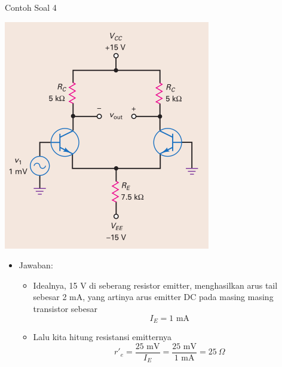 \documentclass[aspectratio=169]{beamer}
\begin{document}
\begin{frame}{Contoh Soal 4}
	\begin{multicols}{2}
		\begin{center}
			\includegraphics[height=0.7\textheight]{gambar/01.contoh_soal_1-2}
		\end{center}
		\columnbreak
		\begin{itemize}
			\item Jawaban:
			\begin{itemize}
				\item Idealnya, 15 V di seberang resistor emitter, menghasilkan arus tail sebesar 2 mA, yang artinya arus emitter DC pada masing masing transistor sebesar
				\[ I_E = 1 \text{ mA} \]
				\item Lalu kita hitung resistansi emitternya
				\[ r'_e = \frac{25 \text{ mV}}{ I_E} =\frac{25 \text{ mV}}{1 \text{ mA}} = 25~\Omega \]
			\end{itemize}
		\end{itemize}
	\end{multicols}
\end{frame}
\end{document}
